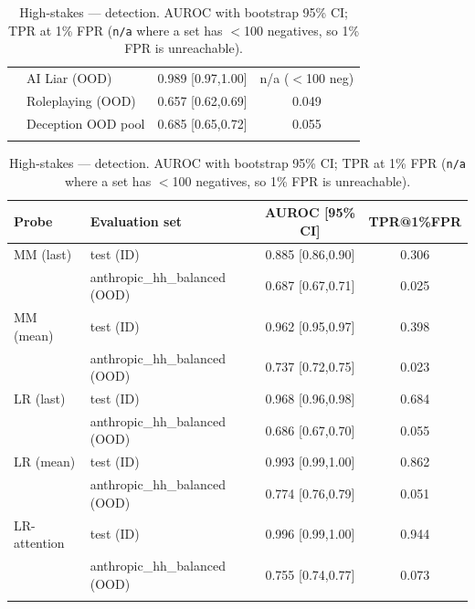 \begin{table}[H]
\begin{minipage}[t]{0.49\textwidth}
\begin{tabular}{llcc}
 & AI Liar (OOD) & 0.989 [0.97,1.00] & n/a ($<$100 neg) \\
 & Roleplaying (OOD) & 0.657 [0.62,0.69] & 0.049 \\
 & Deception OOD pool & 0.685 [0.65,0.72] & 0.055 \\
\addlinespace[2pt]
\bottomrule
\end{tabular}
\caption{Deception --- detection. AUROC with bootstrap 95\% CI; TPR at 1\% FPR (\texttt{n/a} where a set has $<$100 negatives, so 1\% FPR is unreachable).}
\label{tab:app-det-deception}
\end{minipage}
\hfill
\begin{minipage}[t]{0.49\textwidth}
\centering
\centering
\scriptsize
\setlength{\tabcolsep}{3pt}
\begin{tabular}{llcc}
\toprule
Probe & Evaluation set & AUROC [95\% CI] & TPR@1\%FPR \\
\midrule
MM (last) & test (ID) & 0.885 [0.86,0.90] & 0.306 \\
 & anthropic\_hh\_balanced (OOD) & 0.687 [0.67,0.71] & 0.025 \\
\addlinespace[2pt]
MM (mean) & test (ID) & 0.962 [0.95,0.97] & 0.398 \\
 & anthropic\_hh\_balanced (OOD) & 0.737 [0.72,0.75] & 0.023 \\
\addlinespace[2pt]
LR (last) & test (ID) & 0.968 [0.96,0.98] & 0.684 \\
 & anthropic\_hh\_balanced (OOD) & 0.686 [0.67,0.70] & 0.055 \\
\addlinespace[2pt]
LR (mean) & test (ID) & 0.993 [0.99,1.00] & 0.862 \\
 & anthropic\_hh\_balanced (OOD) & 0.774 [0.76,0.79] & 0.051 \\
\addlinespace[2pt]
LR-attention & test (ID) & 0.996 [0.99,1.00] & 0.944 \\
 & anthropic\_hh\_balanced (OOD) & 0.755 [0.74,0.77] & 0.073 \\
\addlinespace[2pt]
\bottomrule
\end{tabular}
\caption{High-stakes --- detection. AUROC with bootstrap 95\% CI; TPR at 1\% FPR (\texttt{n/a} where a set has $<$100 negatives, so 1\% FPR is unreachable).}
\label{tab:app-det-highstakes}
\end{minipage}
\end{table}

